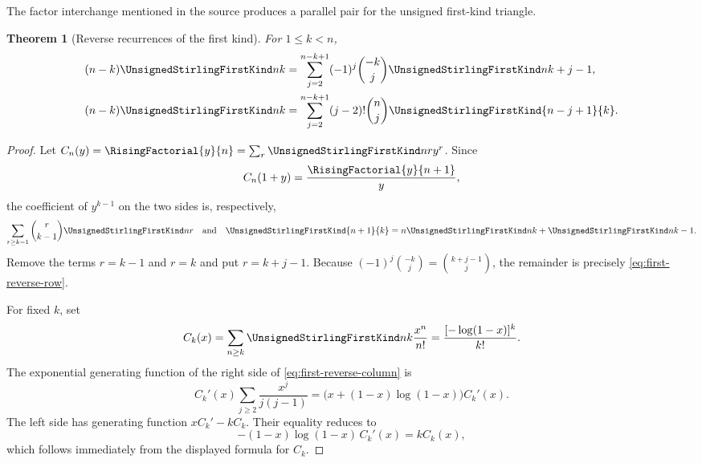 \documentclass[11pt,a4paper,oneside,openany]{book}
\newtheorem{theorem}{Theorem}[chapter]
\theoremstyle{definition}
\theoremstyle{remark}
\begin{document}
The factor interchange mentioned in the source produces a parallel pair for the
unsigned first-kind triangle.

\begin{theorem}[Reverse recurrences of the first kind]
\label{thm:first-reverse-recurrences}
For $1\le k<n$,
\begin{align}
 (n-k)\UnsignedStirlingFirstKind nk
 &=\sum_{j=2}^{n-k+1}(-1)^j\binom{-k}{j}
   \UnsignedStirlingFirstKind n{k+j-1},
 \label{eq:first-reverse-row}\\
 (n-k)\UnsignedStirlingFirstKind nk
 &=\sum_{j=2}^{n-k+1}(j-2)!\binom nj
   \UnsignedStirlingFirstKind{n-j+1}{k}.
 \label{eq:first-reverse-column}
\end{align}
\end{theorem}
\begin{proof}
Let $C_n(y)=\RisingFactorial{y}{n}=\sum_r\UnsignedStirlingFirstKind nr y^r$.  Since
\[
 C_n(1+y)=\frac{\RisingFactorial{y}{n+1}}{y},
\]
the coefficient of $y^{k-1}$ on the two sides is, respectively,
\[
 \sum_{r\ge k-1}\binom r{k-1}\UnsignedStirlingFirstKind nr
 \quad\text{and}\quad
 \UnsignedStirlingFirstKind{n+1}{k}=n\UnsignedStirlingFirstKind nk+\UnsignedStirlingFirstKind n{k-1}.
\]
Remove the terms $r=k-1$ and $r=k$ and put $r=k+j-1$.  Because
$(-1)^j\binom{-k}{j}=\binom{k+j-1}{j}$, the remainder is precisely
\eqref{eq:first-reverse-row}.

For fixed $k$, set
\[
 C_k(x)=\sum_{n\ge k}\UnsignedStirlingFirstKind nk\frac{x^n}{n!}
       =\frac{[-\log(1-x)]^k}{k!}.
\]
The exponential generating function of the right side of
\eqref{eq:first-reverse-column} is
\[
 C_k'(x)\sum_{j\ge2}\frac{x^j}{j(j-1)}
 =\bigl(x+(1-x)\log(1-x)\bigr)C_k'(x).
\]
The left side has generating function $xC_k'-kC_k$.  Their equality reduces to
\[
 -(1-x)\log(1-x)\,C_k'(x)=kC_k(x),
\]
which follows immediately from the displayed formula for $C_k$.
\end{proof}
\end{document}
